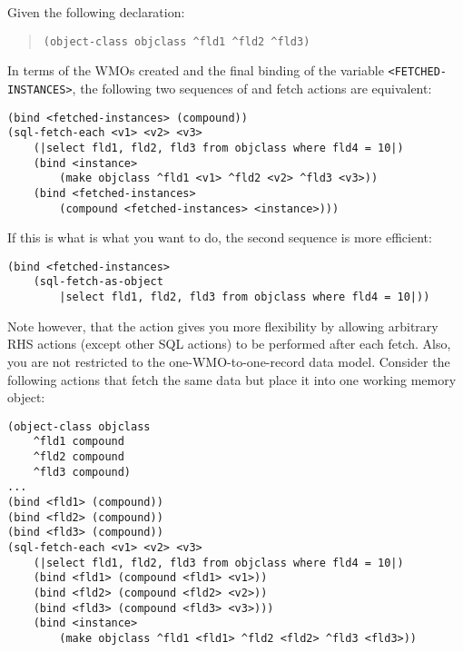 Given the following  declaration:

\begin{quote}
\begin{verbatim}
(object-class objclass ^fld1 ^fld2 ^fld3)
\end{verbatim}
\end{quote}

In terms of the WMOs created and the final binding of the variable
\verb|<FETCHED-INSTANCES>|, the following two sequences of 
and fetch actions are equivalent:

\begin{exampl}
\begin{verbatim}
(bind <fetched-instances> (compound))
(sql-fetch-each <v1> <v2> <v3>
    (|select fld1, fld2, fld3 from objclass where fld4 = 10|)
    (bind <instance>
        (make objclass ^fld1 <v1> ^fld2 <v2> ^fld3 <v3>))
    (bind <fetched-instances>
        (compound <fetched-instances> <instance>)))
\end{verbatim}
\end{exampl}          

If this is what is what you want to do, the second sequence is more
efficient:

\begin{exampl}
\begin{verbatim}
(bind <fetched-instances>
    (sql-fetch-as-object
        |select fld1, fld2, fld3 from objclass where fld4 = 10|))
\end{verbatim}
\end{exampl}

Note however, that the  action gives you more
flexibility by allowing arbitrary RHS actions (except other SQL
actions) to be performed after each fetch. Also, you are not
restricted to the one-WMO-to-one-record data model.  Consider the
following actions that fetch the same data but place it into one
working memory object:

\begin{exampl}
\begin{verbatim}
(object-class objclass
    ^fld1 compound
    ^fld2 compound
    ^fld3 compound)
...
(bind <fld1> (compound))
(bind <fld2> (compound))
(bind <fld3> (compound))
(sql-fetch-each <v1> <v2> <v3>
    (|select fld1, fld2, fld3 from objclass where fld4 = 10|)
    (bind <fld1> (compound <fld1> <v1>))
    (bind <fld2> (compound <fld2> <v2>))
    (bind <fld3> (compound <fld3> <v3>)))
    (bind <instance>
        (make objclass ^fld1 <fld1> ^fld2 <fld2> ^fld3 <fld3>))
\end{verbatim}
\end{exampl}          

